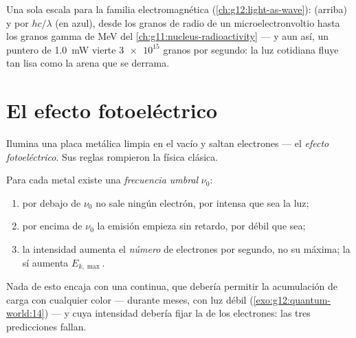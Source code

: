 \begin{omfigure}

{\small Una sola escala para la familia electromagnética
(\cref{ch:g12:light-as-wave}):  (arriba) y  por 
$hc/\lambda$ (en azul), desde los granos de radio de un microelectronvoltio hasta los
granos gamma de \unit{MeV} del \cref{ch:g11:nucleus-radioactivity} --- y aun así, un
puntero de \qty{1.0}{mW} vierte $\num{3e15}$ granos por segundo: la luz cotidiana
fluye tan lisa como la arena que se derrama.}
\end{omfigure}

\section{El efecto fotoeléctrico}

Ilumina una placa metálica limpia en el vacío y saltan electrones --- el \emph{efecto
fotoeléctrico}. Sus reglas rompieron la física clásica.

\begin{proposition}\label{prop:g12:quantum-world:facts}
Para cada metal existe una \emph{frecuencia umbral} $\nu_0$:
\begin{enumerate}
  \item por debajo de $\nu_0$ no sale ningún electrón, por intensa que sea la luz;
  \item por encima de $\nu_0$ la emisión empieza sin retardo, por débil que sea;
  \item la intensidad aumenta el \emph{número} de electrones por segundo, no su
         máxima; la  sí aumenta $E_{k,\max}$.
\end{enumerate}
Nada de esto encaja con una  continua, que debería permitir la acumulación de
carga con cualquier color --- durante meses, con luz débil
(\cref{exo:g12:quantum-world:14}) --- y cuya intensidad debería fijar la  de
los electrones: las tres predicciones fallan.
\end{proposition}
\admitted

